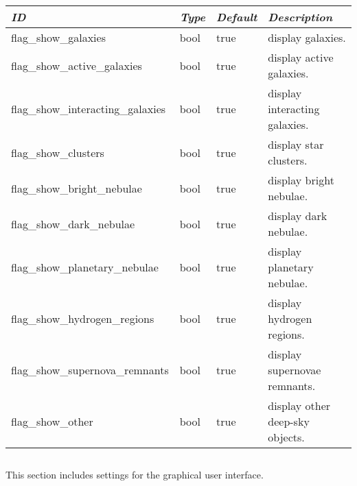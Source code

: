 \begin{longtabu} to \textwidth {l|l|l|X}\toprule
\emph{ID} & \emph{Type} & \emph{Default} & \emph{Description}\\\midrule
flag\_show\_galaxies              & bool & true & display galaxies.\\\midrule
flag\_show\_active\_galaxies      & bool & true & display active galaxies. \\\midrule
flag\_show\_interacting\_galaxies & bool & true & display interacting galaxies.  \\\midrule
flag\_show\_clusters              & bool & true & display star clusters.  \\\midrule
flag\_show\_bright\_nebulae       & bool & true & display bright nebulae.  \\\midrule
flag\_show\_dark\_nebulae         & bool & true & display dark nebulae.  \\\midrule
flag\_show\_planetary\_nebulae    & bool & true & display planetary nebulae.  \\\midrule
flag\_show\_hydrogen\_regions     & bool & true & display hydrogen regions. \\\midrule
flag\_show\_supernova\_remnants   & bool & true & display supernovae remnants. \\\midrule
flag\_show\_other                 & bool & true & display other deep-sky objects.  \\\bottomrule
\end{longtabu}

\subsection{}\label{sec:config.ini:gui}

This section includes settings for the graphical user interface.

